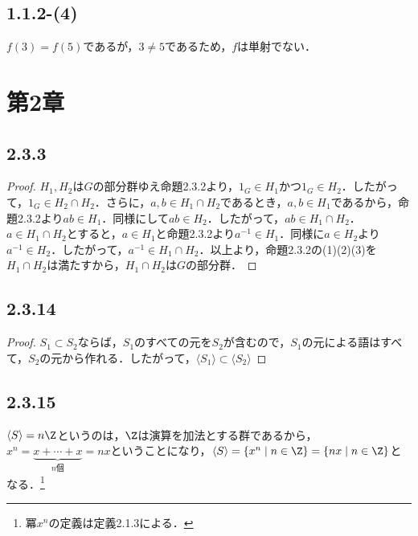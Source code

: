 \documentclass[uplatex,dvipdfmx,a4paper,11pt]{jsarticle}
\newenvironment{tleftbar}{\begin{tbleftline}\setlength{\parindent}{1zw}}{\end{tbleftline}}
\begin{document}
\subsection*{1.1.2-(4)}
\begin{tleftbar}
$f(3)= f(5)$であるが，$3 \ne 5$であるため，$f$は単射でない．
\end{tleftbar}

\newpage 

\section*{第2章}

\subsection*{2.3.3}
\begin{tleftbar}
    \begin{proof}
        $H_1,H_2$は$G$の部分群ゆえ命題2.3.2より，$1_{G}\in H_1$かつ$1_{G}\in H_2$．したがって，$1_G\in H_2\cap H_2$．さらに，$a,b \in H_1\cap H_2$であるとき，$a,b\in H_1$であるから，命題2.3.2より$ab\in H_1$．同様にして$ab\in H_2$．したがって，$ab\in H_1\cap H_2$．$a\in H_1\cap H_2$とすると，$a\in H_1$と命題2.3.2より$a^{-1}\in H_1$．同様に$a\in H_2$より$a^{-1}\in H_2$．したがって，$a^{-1}\in H_1 \cap H_2$．以上より，命題2.3.2の(1)(2)(3)を$H_1\cap H_2$は満たすから，$H_1\cap H_2$は$G$の部分群．
    \end{proof}
\end{tleftbar}


\subsection*{2.3.14}
\begin{tleftbar}
    \begin{proof}
        $S_1 \subset S_2$ならば，$S_1$のすべての元を$S_2$が含むので，$S_1$の元による語はすべて，$S_2$の元から作れる．したがって，$\langle S_1 \rangle \subset \langle S_2 \rangle$
    \end{proof}
\end{tleftbar}

\subsection*{2.3.15}
\begin{tleftbar}
    $\langle S \rangle =n\Z$というのは，$\Z$は演算を加法とする群であるから，$x^n=\underbrace{x+\cdots+x}_{n個}=nx$ということになり，$\langle S \rangle =\{x^n\mid n\in \Z\}=\{nx\mid n\in \Z\}$となる．\footnote{冪$x^n$の定義は定義2.1.3による．}
\end{tleftbar}
\end{document}
